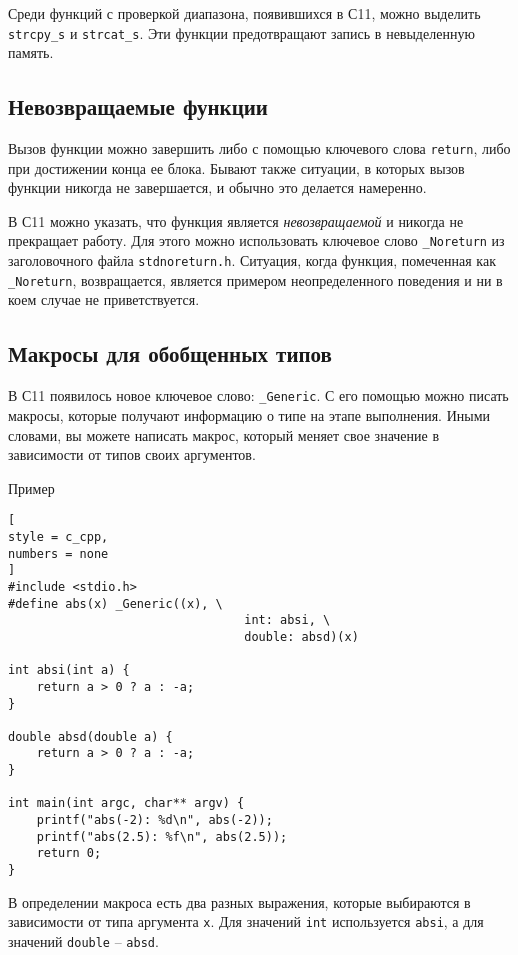 \documentclass[%
	11pt,
	a4paper,
	utf8,
		]{article}
\begin{document}
Среди функций с проверкой диапазона, появившихся в С11, можно выделить \verb|strcpy_s| и \verb|strcat_s|. Эти функции предотвращают запись в невыделенную память.

\subsection{Невозвращаемые функции}

Вызов функции можно завершить либо с помощью ключевого слова \verb|return|, либо при достижении конца ее блока. Бывают также ситуации, в которых вызов функции никогда не завершается, и обычно это делается намеренно.

В С11 можно указать, что функция является \emph{невозвращаемой} и никогда не прекращает работу. Для этого можно использовать ключевое слово \verb|_Noreturn| из заголовочного файла \verb|stdnoreturn.h|. Ситуация, когда функция, помеченная как \verb|_Noreturn|, возвращается, является примером неопределенного поведения и ни в коем случае не приветствуется.

\subsection{Макросы для обобщенных типов}

В С11 появилось новое ключевое слово: \verb|_Generic|. С его помощью можно писать макросы, которые получают информацию о типе на этапе выполнения. Иными словами, вы можете написать макрос, который меняет свое значение в зависимости от типов своих аргументов.

Пример 
\begin{lstlisting}[
style = c_cpp,
numbers = none
]
#include <stdio.h>
#define abs(x) _Generic((x), \
                                 int: absi, \
                                 double: absd)(x)
                                 
int absi(int a) {
    return a > 0 ? a : -a;
}

double absd(double a) {
    return a > 0 ? a : -a;
}

int main(int argc, char** argv) {
    printf("abs(-2): %d\n", abs(-2));
    printf("abs(2.5): %f\n", abs(2.5));
    return 0;
}
\end{lstlisting}

В определении макроса есть два разных выражения, которые выбираются в зависимости от типа аргумента \verb|x|. Для значений \verb|int| используется \verb|absi|, а для значений \verb|double| -- \verb|absd|. 
\end{document}
